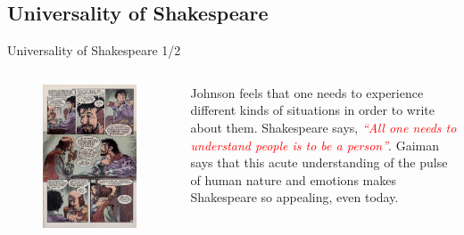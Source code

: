 \documentclass{beamer}
\begin{document}
  \subsection{Universality of Shakespeare}
  \begin{frame}{Universality of Shakespeare 1/2}
    \begin{columns}[c]
      \begin{figure}[htp]
        \begin{center}
          \centering
          \includegraphics[scale=0.3]{universality.jpg}
        \end{center}
      \end{figure}
      Johnson feels that one needs to experience different kinds of situations in order to write about them. Shakespeare says, \textcolor{red}{\emph{``All one needs to understand people is to be a person''}}. Gaiman says that this acute understanding of the pulse of human nature and emotions makes Shakespeare so appealing, even today.

\end{columns}
\end{frame}
\end{document}
